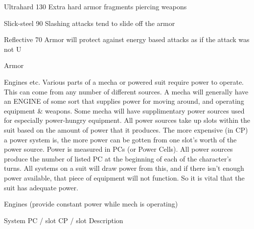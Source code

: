 \documentclass[twoside]{book}
\begin{document}
                      
                       Ultrahard   
                       130%
                         Extra hard armor fragments piercing
                         weapons 
                      
                      
                       Slick-steel   
                       90%
                         Slashing attacks tend to slide off the
                         armor 
                      
                      
                       Reflective   
                       70%
                          Armor will protect against energy based
                         attacks as if the attack was not U 
                      
                    
                  Armor  
                  
                
                
                Engines etc.  
                    Various parts of a mecha or powered suit
                   require power to operate. This can come from any
                   number of different sources. A mecha will generally
                   have an ENGINE of some sort that supplies power for
                   moving around, and operating equipment \& weapons.
                   Some mecha will have supplimentary power sources used
                   for especially power-hungry equipment. All power
                   sources take up slots within the suit based on the
                   amount of power that it produces. The more expensive
                   (in CP) a power system is, the more power can be
                   gotten from one slot’s worth of the power
                   source. Power is measured in PCs (or Power Cells). All
                   power sources produce the number of listed PC at the
                   beginning of each of the character’s turns. All
                   systems on a suit will draw power from this, and if
                   there isn’t enough power available, that piece
                   of equipment will not function. So it is vital that
                   the suit has adequate power. 
                  
                    Engines (provide constant power while mech is
                     operating)
                    
                      
                       System   
                       PC / slot   
                       CP / slot   
                       Description   
                      
\end{document}
